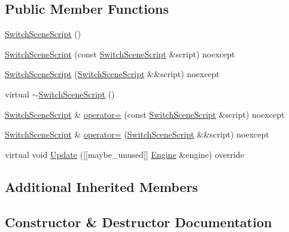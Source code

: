 \subsection*{Public Member Functions}
\begin{DoxyCompactItemize}
\item 
\mbox{\hyperlink{classmage_1_1script_1_1_switch_scene_script_a7905bc08a81fbf2680e1b9e88a94988d}{Switch\+Scene\+Script}} ()
\item 
\mbox{\hyperlink{classmage_1_1script_1_1_switch_scene_script_af895d885db98e4b3ab7d3faca8fc8d8f}{Switch\+Scene\+Script}} (const \mbox{\hyperlink{classmage_1_1script_1_1_switch_scene_script}{Switch\+Scene\+Script}} \&script) noexcept
\item 
\mbox{\hyperlink{classmage_1_1script_1_1_switch_scene_script_af48c004b9419d4e462b6820297ebebd8}{Switch\+Scene\+Script}} (\mbox{\hyperlink{classmage_1_1script_1_1_switch_scene_script}{Switch\+Scene\+Script}} \&\&script) noexcept
\item 
virtual \mbox{\hyperlink{classmage_1_1script_1_1_switch_scene_script_ae4a846ba55d7b0ddb3730997ae162ba3}{$\sim$\+Switch\+Scene\+Script}} ()
\item 
\mbox{\hyperlink{classmage_1_1script_1_1_switch_scene_script}{Switch\+Scene\+Script}} \& \mbox{\hyperlink{classmage_1_1script_1_1_switch_scene_script_afb9ad12163066a2d801e0fdd0065303f}{operator=}} (const \mbox{\hyperlink{classmage_1_1script_1_1_switch_scene_script}{Switch\+Scene\+Script}} \&script) noexcept
\item 
\mbox{\hyperlink{classmage_1_1script_1_1_switch_scene_script}{Switch\+Scene\+Script}} \& \mbox{\hyperlink{classmage_1_1script_1_1_switch_scene_script_a59d77732c9ab91807f30af81accda316}{operator=}} (\mbox{\hyperlink{classmage_1_1script_1_1_switch_scene_script}{Switch\+Scene\+Script}} \&\&script) noexcept
\item 
virtual void \mbox{\hyperlink{classmage_1_1script_1_1_switch_scene_script_a04b60ff2b34f490012e4115ae1e788d7}{Update}} (\mbox{[}\mbox{[}maybe\+\_\+unused\mbox{]}\mbox{]} \mbox{\hyperlink{classmage_1_1_engine}{Engine}} \&engine) override
\end{DoxyCompactItemize}
\subsection*{Additional Inherited Members}


\subsection{Constructor \& Destructor Documentation}
\mbox{\label{classmage_1_1script_1_1_switch_scene_script_a7905bc08a81fbf2680e1b9e88a94988d}} 
